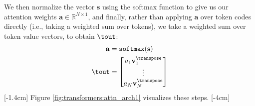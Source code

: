 We then normalize the vector $\mathbf{s}$ using the softmax function to give us our attention weights $\mathbf{a} \in \mathbb{R}^{N \times 1}$, and finally, rather than applying $\mathbf{a}$ over token codes directly (i.e., taking a weighted sum over tokens), we take a weighted sum over token value vectors, to obtain $\tout$: %
\begin{align}
    \mathbf{a} &= \texttt{softmax}(\mathbf{s})\\
    \tout &= \begin{bmatrix}
        a_1\mathbf{v}_1^\transpose\\
        \vdots \\
        a_N\mathbf{v}_N^\transpose\\
    \end{bmatrix} 
\end{align}
[-1.4cm]
Figure \ref{fig:transformers:attn_arch1} visualizes these steps.
[-4cm]

